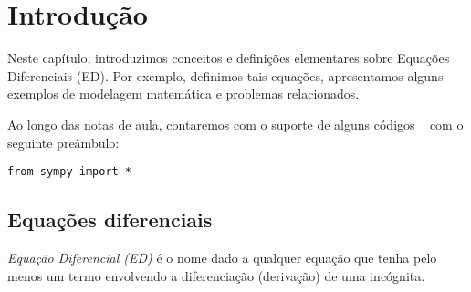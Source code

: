 
\chapter{Introdução}\label{cap_intro}
\thispagestyle{fancy}

Neste capítulo, introduzimos conceitos e definições elementares sobre Equações Diferenciais (ED). Por exemplo, definimos tais equações, apresentamos alguns exemplos de modelagem matemática e problemas relacionados.

\ifispython
\begin{obs}\label{obs:python}
Ao longo das notas de aula, contaremos com o suporte de alguns códigos \python~ com o seguinte preâmbulo:
\begin{verbatim}
from sympy import *
\end{verbatim}
\end{obs}
\fi


\section{Equações diferenciais}\label{cap_intro_sec_ed}

\emph{Equação Diferencial (ED)} é o nome dado a qualquer equação que tenha pelo menos um termo envolvendo a diferenciação (derivação) de uma incógnita.

